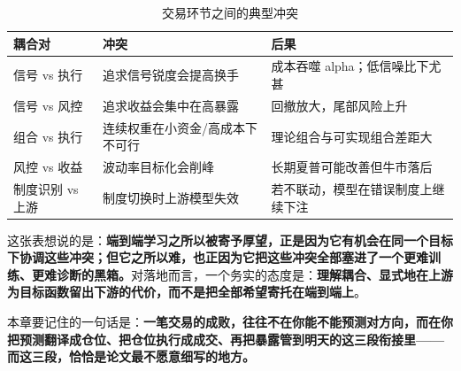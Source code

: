 \begin{table}[htbp]
\centering
\caption{交易环节之间的典型冲突}
\label{tab:conflict}
\begin{tabular}{@{}>{\raggedright\arraybackslash}p{3.2cm}>{\raggedright\arraybackslash}p{4.4cm}>{\raggedright\arraybackslash}p{7.6cm}@{}}
\toprule
耦合对 & 冲突 & 后果 \\
\midrule
信号 vs 执行 & 追求信号锐度会提高换手 & 成本吞噬 alpha；低信噪比下尤甚 \\
信号 vs 风控 & 追求收益会集中在高暴露 & 回撤放大，尾部风险上升 \\
组合 vs 执行 & 连续权重在小资金/高成本下不可行 & 理论组合与可实现组合差距大 \\
风控 vs 收益 & 波动率目标化会削峰 & 长期夏普可能改善但牛市落后 \\
制度识别 vs 上游 & 制度切换时上游模型失效 & 若不联动，模型在错误制度上继续下注 \\
\bottomrule
\end{tabular}
\end{table}

这张表想说的是：\textbf{端到端学习之所以被寄予厚望，正是因为它有机会在同一个目标下协调这些冲突；但它之所以难，也正因为它把这些冲突全部塞进了一个更难训练、更难诊断的黑箱。}对落地而言，一个务实的态度是：\textbf{理解耦合、显式地在上游为目标函数留出下游的代价，而不是把全部希望寄托在端到端上}。

本章要记住的一句话是：\textbf{一笔交易的成败，往往不在你能不能预测对方向，而在你把预测翻译成仓位、把仓位执行成成交、再把暴露管到明天的这三段衔接里——而这三段，恰恰是论文最不愿意细写的地方。}
